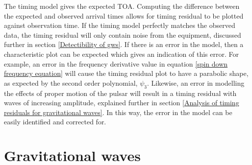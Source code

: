 \documentclass[12pt]{article}
\begin{document}
	\noindent The timing model gives the expected TOA. Computing the difference between the expected and observed arrival times allows for timing residual to be plotted against observation time. If the timing model perfectly matches the observed data, the timing residual will only contain noise from the equipment, discussed further in section \ref{Detectibility of gws}. If there is an error in the model, then a characteristic plot can be expected which gives an indication of this error. For example, an error in the frequency derivative value in equation \ref{spin down frequency equation} will cause the timing residual plot to have a parabolic shape, as expected by the second order polynomial, $\psi_3$. Likewise, an error in modelling the effects of proper motion of the pulsar will result in a timing residual with waves of increasing amplitude, explained further in section \ref{Analysis of timing residuals for gravitational waves}. In this way, the error in the model can be easily identified and corrected for. 

	\section{Gravitational waves}
	
\end{document}
